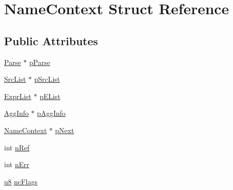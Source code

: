 \hypertarget{struct_name_context}{\section{Name\-Context Struct Reference}
\label{struct_name_context}
}
\subsection*{Public Attributes}
\begin{DoxyCompactItemize}
\item 
\hyperlink{struct_parse}{Parse} $\ast$ \hyperlink{struct_name_context_a14635249bf75d5e18124089571dd2386}{p\-Parse}
\item 
\hyperlink{struct_src_list}{Src\-List} $\ast$ \hyperlink{struct_name_context_a6ede21da33e2e9bd3d0c5fe90a3ec72c}{p\-Src\-List}
\item 
\hyperlink{struct_expr_list}{Expr\-List} $\ast$ \hyperlink{struct_name_context_a8c752d7fb9b28179156c569cc57ba6f2}{p\-E\-List}
\item 
\hyperlink{struct_agg_info}{Agg\-Info} $\ast$ \hyperlink{struct_name_context_aeb3ff72c03dd770d421cadc2195a5644}{p\-Agg\-Info}
\item 
\hyperlink{struct_name_context}{Name\-Context} $\ast$ \hyperlink{struct_name_context_a82ce0ec8a3cc3d792e1f38bb5e0ad5fc}{p\-Next}
\item 
int \hyperlink{struct_name_context_ad68616ce2a58fa1b135e0dcf953bdc97}{n\-Ref}
\item 
int \hyperlink{struct_name_context_aba0b89b42e945c4c96d57a8fe011329c}{n\-Err}
\item 
\hyperlink{sqlite3_8c_a74a0f6424ae628af25f23f0a35f6ead3}{u8} \hyperlink{struct_name_context_a3dcc2e5442b6a74440a15226139b78d2}{nc\-Flags}
\end{DoxyCompactItemize}


